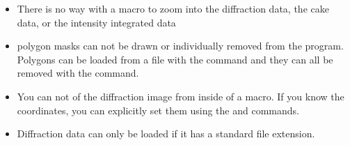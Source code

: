 \begin{itemize}
    \item There is no way with a macro to zoom into the diffraction
    data, the cake data, or the intensity integrated data
    \item polygon masks can not be drawn or individually removed
    from the program. Polygons can be loaded from a file with the
     command and they can all be removed with the
     command.
    \item You can not  of the diffraction image
    from inside of a macro. If you know the coordinates, you can
    explicitly set them using the  and 
    commands.
    \item Diffraction data can only be loaded if it has a standard 
    file extension. 
\end{itemize}

